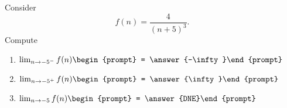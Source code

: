 \documentclass{ximera}
\author{Bart Snapp}
\begin{document}
\begin{exercise}
Consider 
\[
f(n) = \frac{4}{(n+5)^3}.
\]
Compute
\begin{enumerate}
\item $\lim_{n\to -5^- } f(n) \begin{prompt} = \answer{-\infty}\end{prompt}$
\item $\lim_{n\to -5^+ } f(n) \begin{prompt} = \answer{\infty}\end{prompt}$
\item $\lim_{n\to -5 } f(n) \begin{prompt} = \answer{DNE}\end{prompt}$
\end{enumerate}
\end{exercise}
\end{document}
